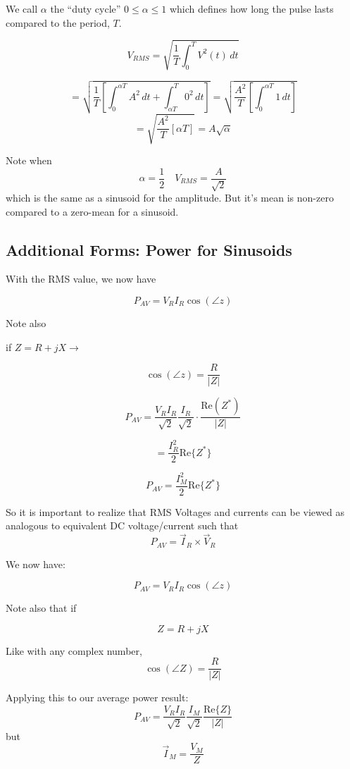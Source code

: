 We call $\alpha $ the ``duty cycle'' \quad $0 \leq \alpha \leq 1$ which defines
how long the pulse lasts compared to the period, $T$.

\[
V_{RMS} = \sqrt{\frac{1}{T} \int_0^T V^2(t) \, dt}
\]

\[
= \sqrt{\frac{1}{T} \left[ \int_0^{\alpha T} A^2 \, dt +  \int_{\alpha T}^T 0^2 \, dt \right]}
= \sqrt{\frac{A^2}{T} [\int_0^{\alpha T} 1 \, dt] }
\]
\[
=\sqrt{\frac{A^2}{T} [ \alpha T] }= A\sqrt{\alpha}
\]

Note when
\[ \alpha = \frac{1}{2} \quad V_{RMS} = \frac{A}{\sqrt{2}}
\]
which is the same as a sinusoid for the amplitude.  But it's mean is non-zero
compared to a zero-mean for a sinusoid.








\subsection{Additional Forms:  Power for Sinusoids}
With the RMS value, we now have

\[
P_{AV} = V_R I_R \cos(\angle z)
\]

\noindent Note also

if $Z = R + jX \rightarrow$


\[
\cos(\angle z) = \frac{R}{|Z|}
\]

\[
P_{AV} = \frac{V_R I_R}{\sqrt{2}} \frac{I_R}{\sqrt{2}} \cdot \frac{\text{Re}(Z^*)}{|Z|}
\]

\[
= \frac{I_R^2}{2} \text{Re}\{Z^*\}
\]

\[
P_{AV} = \frac{I_M^2}{2} \text{Re}\{Z^*\}
\]

So it is important to realize that  RMS Voltages and currents can
be viewed as analogous to
equivalent DC voltage/current such that
\[
P_{AV} = \vec I_R\times \vec V_R
\]


 We now have:

\[
P_{AV} = V_R I_R \cos(\angle z)
\]

  Note also that if

\[
Z = R + jX
\]

Like with any complex number,
\[
\cos(\angle Z) = \frac{R}{|Z|}
\]

Applying this to our average power result:
\[
P_{AV} = \frac{V_R I_R}{\sqrt{2}} \frac{I_M}{\sqrt{2}}  \frac{\mathrm{Re}\{Z\} }{|Z|}
\]
but
\[
\vec{I}_M = \frac{V_M}{Z}
\]

